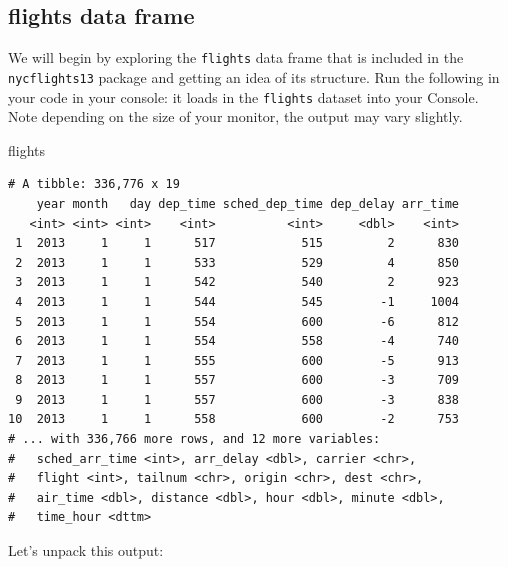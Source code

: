 \documentclass[12pt,]{krantz}
\makeatletter
\newenvironment{Shaded}{\begin{snugshade}}{\end{snugshade}}
\newcommand{\NormalTok}[1]{#1}
\newenvironment{kframe}{%
\medskip{}
\setlength{\fboxsep}{.8em}
 \def\at@end@of@kframe{}%
 \ifinner\ifhmode%
  \def\at@end@of@kframe{\end{minipage}}%
  \begin{minipage}{\columnwidth}%
 \fi\fi%
 \def\FrameCommand##1{\hskip\@totalleftmargin \hskip-\fboxsep
 \colorbox{shadecolor}{##1}\hskip-\fboxsep
     \hskip-\linewidth \hskip-\@totalleftmargin \hskip\columnwidth}%
 \MakeFramed {\advance\hsize-\width
   \@totalleftmargin\z@ \linewidth\hsize
   \@setminipage}}%
 {\par\unskip\endMakeFramed%
 \at@end@of@kframe}
\renewenvironment{Shaded}{\begin{kframe}}{\end{kframe}}
\makeatother
\begin{document}
\subsection{flights data frame}\label{flights-data-frame}

We will begin by exploring the \texttt{flights} data frame that is
included in the \texttt{nycflights13} package and getting an idea of its
structure. Run the following in your code in your console: it loads in
the \texttt{flights} dataset into your Console. Note depending on the
size of your monitor, the output may vary slightly.

\begin{Shaded}
\begin{Highlighting}[]
\NormalTok{flights}
\end{Highlighting}
\end{Shaded}

\begin{verbatim}
# A tibble: 336,776 x 19
    year month   day dep_time sched_dep_time dep_delay arr_time
   <int> <int> <int>    <int>          <int>     <dbl>    <int>
 1  2013     1     1      517            515         2      830
 2  2013     1     1      533            529         4      850
 3  2013     1     1      542            540         2      923
 4  2013     1     1      544            545        -1     1004
 5  2013     1     1      554            600        -6      812
 6  2013     1     1      554            558        -4      740
 7  2013     1     1      555            600        -5      913
 8  2013     1     1      557            600        -3      709
 9  2013     1     1      557            600        -3      838
10  2013     1     1      558            600        -2      753
# ... with 336,766 more rows, and 12 more variables:
#   sched_arr_time <int>, arr_delay <dbl>, carrier <chr>,
#   flight <int>, tailnum <chr>, origin <chr>, dest <chr>,
#   air_time <dbl>, distance <dbl>, hour <dbl>, minute <dbl>,
#   time_hour <dttm>
\end{verbatim}

Let's unpack this output:
\end{document}
